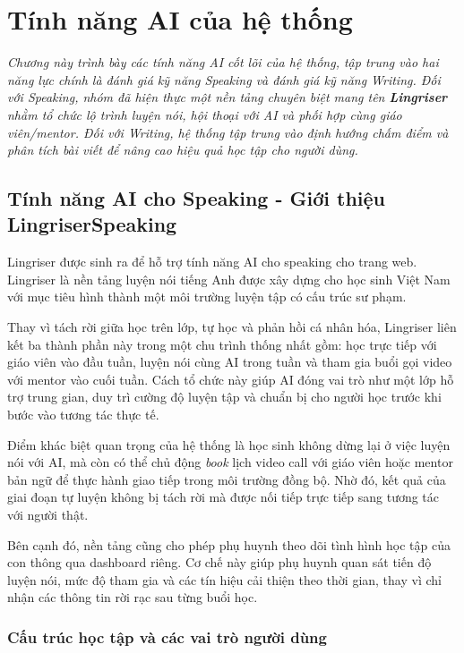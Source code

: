 \chapter{Tính năng AI của hệ thống}
\textit{Chương này trình bày các tính năng AI cốt lõi của hệ thống, tập trung vào hai năng lực chính là đánh giá kỹ năng Speaking và đánh giá kỹ năng Writing. Đối với Speaking, nhóm đã hiện thực một nền tảng chuyên biệt mang tên \textbf{Lingriser} nhằm tổ chức lộ trình luyện nói, hội thoại với AI và phối hợp cùng giáo viên/mentor. Đối với Writing, hệ thống tập trung vào định hướng chấm điểm và phân tích bài viết để nâng cao hiệu quả học tập cho người dùng.}


\section{Tính năng AI cho Speaking - Giới thiệu LingriserSpeaking}
Lingriser được sinh ra để hỗ trợ tính năng AI cho speaking cho trang web. Lingriser là nền tảng luyện nói tiếng Anh được xây dựng cho học sinh Việt Nam với mục tiêu hình thành một môi trường luyện tập có cấu trúc sư phạm.

Thay vì tách rời giữa học trên lớp, tự học và phản hồi cá nhân hóa, Lingriser liên kết ba thành phần này trong một chu trình thống nhất gồm: học trực tiếp với giáo viên vào đầu tuần, luyện nói cùng AI trong tuần và tham gia buổi gọi video với mentor vào cuối tuần. Cách tổ chức này giúp AI đóng vai trò như một lớp hỗ trợ trung gian, duy trì cường độ luyện tập và chuẩn bị cho người học trước khi bước vào tương tác thực tế.

Điểm khác biệt quan trọng của hệ thống là học sinh không dừng lại ở việc luyện nói với AI, mà còn có thể chủ động \textit{book} lịch video call với giáo viên hoặc mentor bản ngữ để thực hành giao tiếp trong môi trường đồng bộ. Nhờ đó, kết quả của giai đoạn tự luyện không bị tách rời mà được nối tiếp trực tiếp sang tương tác với người thật.

Bên cạnh đó, nền tảng cũng cho phép phụ huynh theo dõi tình hình học tập của con thông qua dashboard riêng. Cơ chế này giúp phụ huynh quan sát tiến độ luyện nói, mức độ tham gia và các tín hiệu cải thiện theo thời gian, thay vì chỉ nhận các thông tin rời rạc sau từng buổi học.

\subsection{Cấu trúc học tập và các vai trò người dùng}

